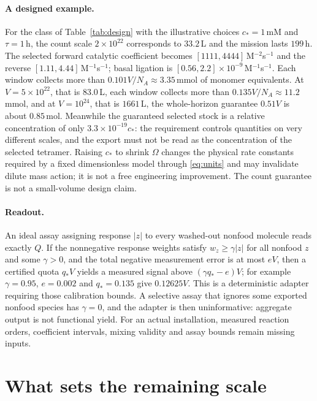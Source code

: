 \documentclass[11pt,letterpaper]{article}
\theoremstyle{plain}
\theoremstyle{definition}
\theoremstyle{remark}
\numberwithin{equation}{section}
\begin{document}
\paragraph{A designed example.}
For the class of Table~\ref{tab:design} with the illustrative choices $c_*=1$\,mM and $\tau=1$\,h, the count scale $2\times10^{22}$ corresponds to $33.2$\,L and the mission lasts $199$\,h. The selected forward catalytic coefficient becomes $[1111,4444]$\,M$^{-2}$s$^{-1}$ and the reverse $[1.11,4.44]$\,M$^{-1}$s$^{-1}$; basal ligation is $[0.56,2.2]\times10^{-9}$\,M$^{-1}$s$^{-1}$. Each window collects more than $0.101V/N_A\approx3.35$\,mmol of monomer equivalents. At $V=5\times10^{22}$, that is $83.0$\,L, each window collects more than $0.135V/N_A\approx11.2$\,mmol, and at $V=10^{24}$, that is $1661$\,L, the whole-horizon guarantee $0.51V$ is about $0.85$\,mol. Meanwhile the guaranteed selected stock is a relative concentration of only $3.3\times10^{-19}c_*$: the requirement controls quantities on very different scales, and the export must not be read as the concentration of the selected tetramer. Raising $c_*$ to shrink $\Omega$ changes the physical rate constants required by a fixed dimensionless model through \eqref{eq:units} and may invalidate dilute mass action; it is not a free engineering improvement. The count guarantee is not a small-volume design claim.

\paragraph{Readout.}
An ideal assay assigning response $|z|$ to every washed-out nonfood molecule reads exactly $Q$. If the nonnegative response weights satisfy $w_z\ge\gamma|z|$ for all nonfood $z$ and some $\gamma>0$, and the total negative measurement error is at most $eV$, then a certified quota $q_*V$ yields a measured signal above $(\gamma q_*-e)V$; for example $\gamma=0.95$, $e=0.002$ and $q_*=0.135$ give $0.12625V$. This is a deterministic adapter requiring those calibration bounds. A selective assay that ignores some exported nonfood species has $\gamma=0$, and the adapter is then uninformative: aggregate output is not functional yield. For an actual installation, measured reaction orders, coefficient intervals, mixing validity and assay bounds remain missing inputs.

\section{What sets the remaining scale}\label{sec:scale}
\end{document}
